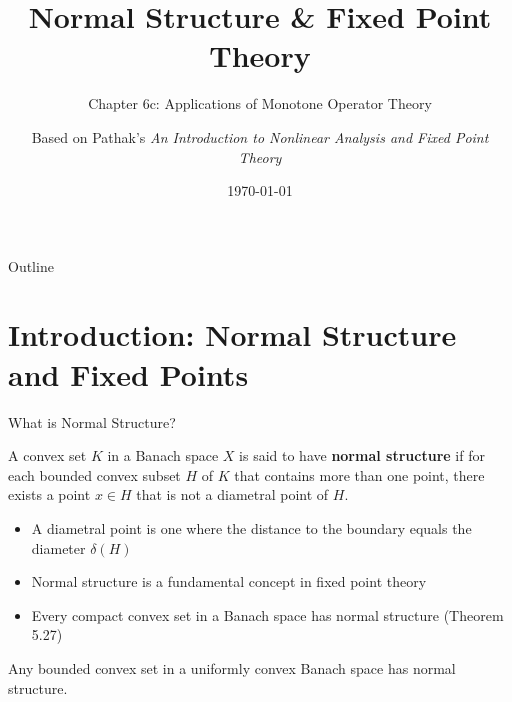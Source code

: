 \documentclass[aspectratio=169,10pt]{beamer}
\title{Normal Structure \& Fixed Point Theory}
\subtitle{Chapter 6c: Applications of Monotone Operator Theory}
\author{Based on Pathak's \textit{An Introduction to Nonlinear Analysis and Fixed Point Theory}}
\date{\today}
\institute{Lecture Series on Monte Carlo Theory}
\begin{document}
\frame{\titlepage}

\begin{frame}[allowframebreaks]{Outline}
    \tableofcontents
\end{frame}

\section{Introduction: Normal Structure and Fixed Points}

\begin{frame}{What is Normal Structure?}
    \begin{definition}
        A convex set $K$ in a Banach space $X$ is said to have \textbf{normal structure} if for each bounded convex subset $H$ of $K$ that contains more than one point, there exists a point $x \in H$ that is not a diametral point of $H$.
    \end{definition}

    \vspace{0.3cm}

    \begin{itemize}
        \item A diametral point is one where the distance to the boundary equals the diameter $\delta(H)$
        \item Normal structure is a fundamental concept in fixed point theory
        \item Every compact convex set in a Banach space has normal structure (Theorem 5.27)
    \end{itemize}

    \begin{example}
        Any bounded convex set in a uniformly convex Banach space has normal structure.
    \end{example}
\end{frame}
\end{document}
